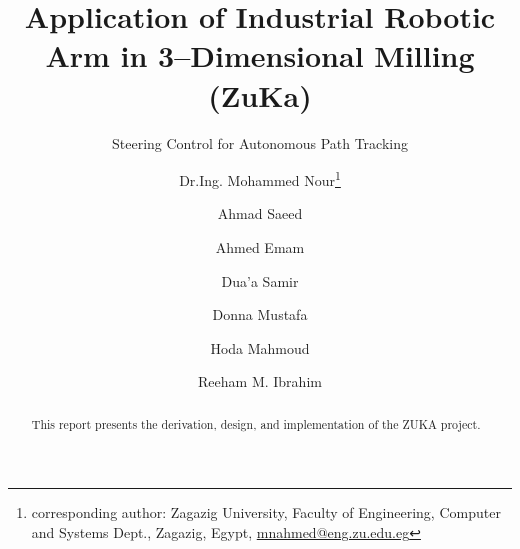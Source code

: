


\thispagestyle{scrplain}

\subject{ZuKa Documentation}
\title{Application of Industrial Robotic Arm in 3--Dimensional Milling (ZuKa)}
\subtitle{Steering Control for Autonomous Path Tracking}
\author{Dr.Ing. Mohammed Nour\footnote{corresponding author: Zagazig University, Faculty of Engineering, Computer and Systems Dept., Zagazig, Egypt, \href{mailto:mnahmed@eng.zu.edu.eg}{mnahmed@eng.zu.edu.eg}} %
\and{Ahmad Saeed}
\and{Ahmed Emam}
\and{Dua’a Samir}
\and{Donna Mustafa}
\and{Hoda Mahmoud}
\and{Reeham M. Ibrahim}
}

\date{}%

\publishers{\vspace{15 mm}\texttt{[image: kuka]}}


\maketitle      %

\vfill
\begin{abstract}
This report presents the derivation, design, and implementation of the ZUKA project.
\end{abstract}

\clearpage
\pagestyle{scrheadings}
\tableofcontents
\clearpage

